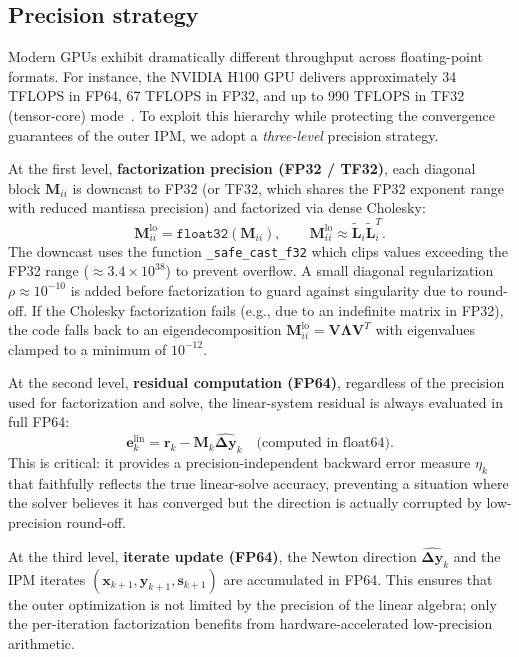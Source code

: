 \documentclass[11pt,twoside]{article}
\newcommand{\bx}{\mathbf{x}}
\newcommand{\by}{\mathbf{y}}
\newcommand{\bs}{\mathbf{s}}
\newcommand{\be}{\mathbf{e}}
\newcommand{\bL}{\mathbf{L}}
\newcommand{\bM}{\mathbf{M}}
\newcommand{\bV}{\mathbf{V}}
\newcommand{\br}{\mathbf{r}}
\newcommand{\bDelta}{\mathbf{\Delta}}
\newcommand{\bLambda}{\mathbf{\Lambda}}
\begin{document}
\subsection{Precision strategy}
\label{sec:precision-strategy}

Modern GPUs exhibit dramatically different throughput across floating-point
formats.  For instance, the NVIDIA H100 GPU delivers approximately 34 TFLOPS
in FP64, 67 TFLOPS in FP32, and up to 990 TFLOPS in TF32 (tensor-core)
mode~\cite{NVIDIA2023}.  To exploit this hierarchy while protecting the
convergence guarantees of the outer IPM, we adopt a \emph{three-level}
precision strategy.

At the first level, \textbf{factorization precision (FP32 / TF32)}, each
diagonal block $\bM_{ii}$ is downcast to FP32 (or TF32, which shares the
FP32 exponent range with reduced mantissa precision) and factorized via
dense Cholesky:
\begin{equation}
  \bM_{ii}^{\text{lo}} = \texttt{float32}(\bM_{ii}),\qquad
  \bM_{ii}^{\text{lo}} \approx \widetilde{\bL}_i \widetilde{\bL}_i^T.
  \label{eq:fp32-factor}
\end{equation}
The downcast uses the function \texttt{\_safe\_cast\_f32} which clips
values exceeding the FP32 range ($\approx 3.4 \times 10^{38}$) to prevent
overflow.  A small diagonal regularization $\rho \approx 10^{-10}$ is added
before factorization to guard against singularity due to round-off.  If
the Cholesky factorization fails (e.g., due to an indefinite matrix in
FP32), the code falls back to an eigendecomposition
$\bM_{ii}^{\text{lo}} = \bV \bLambda \bV^T$ with eigenvalues clamped to a
minimum of $10^{-12}$.

At the second level, \textbf{residual computation (FP64)}, regardless of
the precision used for factorization and solve, the linear-system residual
is always evaluated in full FP64:
\begin{equation}
  \be_k^{\text{lin}} = \br_k - \bM_k\widehat{\bDelta\by}_k
  \quad\text{(computed in float64)}.
  \label{eq:fp64-residual}
\end{equation}
This is critical: it provides a precision-independent backward error
measure $\eta_k$ that faithfully reflects the true linear-solve accuracy,
preventing a situation where the solver believes it has converged but the
direction is actually corrupted by low-precision round-off.

At the third level, \textbf{iterate update (FP64)}, the Newton direction
$\widehat{\bDelta\by}_k$ and the IPM iterates $(\bx_{k+1}, \by_{k+1},
\bs_{k+1})$ are accumulated in FP64.  This ensures that the outer
optimization is not limited by the precision of the linear algebra; only
the per-iteration factorization benefits from hardware-accelerated
low-precision arithmetic.
\end{document}
